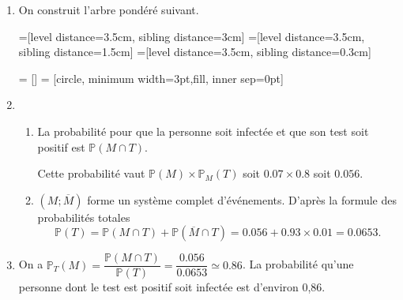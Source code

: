 \documentclass[11pt,fleqn, openany]{book} %
\begin{document}
\begin{solution}\hspace{0pt}

\begin{enumerate}

\item On construit l'arbre pondéré suivant.

=[level distance=3.5cm, sibling distance=3cm]
=[level distance=3.5cm, sibling distance=1.5cm]
=[level distance=3.5cm, sibling distance=0.3cm]

 = []
 = [circle, minimum width=3pt,fill, inner sep=0pt]


\begin{center}
\end{center}

\item \begin{enumerate}
\item La probabilité pour que la personne soit infectée et que son test soit positif est $\mathbb{P}(M \cap T)$. 

Cette probabilité vaut $\mathbb{P}(M) \times \mathbb{P}_M(T)$ soit $0.07 \times 0.8$ soit $0.056$.
\item $(M;\overline{M})$ forme un système complet d'événements. D'après la formule des probabilités totales
\[\mathbb{P}(T)=\mathbb{P}(M \cap T)+\mathbb{P}(\overline{M} \cap T)=0.056+0.93 \times 0.01 = 0.0653.\]
\end{enumerate}
\item On a $\mathbb{P}_T(M)=\dfrac{\mathbb{P}(M\cap T)}{\mathbb{P}(T)}=\dfrac{0.056}{0.0653}\simeq 0.86$. La probabilité qu'une personne dont le test est positif soit infectée est d'environ 0,86.
\end{enumerate}

\end{solution}
\end{document}
